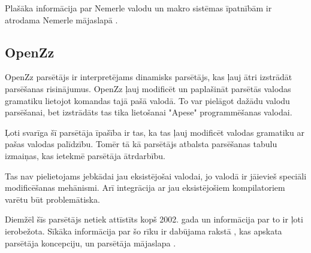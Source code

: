 Plašāka informācija par Nemerle valodu un makro sistēmas īpatnībām ir atrodama Nemerle mājaslapā \cite{NemerleWiki}.

\subsection{\label{sbs:rel_openzz}OpenZz}

OpenZz parsētājs ir interpretējams dinamisks parsētājs, kas ļauj ātri izstrādāt parsēšanas risinājumus. OpenZz ļauj modificēt un paplašināt parsētās valodas gramatiku lietojot komandas tajā pašā valodā. To var pielāgot dažādu valodu parsēšanai, bet izstrādāts tas tika lietošanai "Apese" programmēšanas valodai.

Ļoti svarīga šī parsētāja īpašība ir tas, ka tas ļauj modificēt valodas gramatiku ar pašas valodas palīdzību. Tomēr tā kā parsētājs atbalsta parsēšanas tabulu izmaiņas, kas ietekmē parsētāja ātrdarbību.

Tas nav pielietojams jebkādai jau eksistējošai valodai, jo valodā ir jāievieš speciāli modificēšanas mehānismi. Arī integrācija ar jau eksistējošiem kompilatoriem varētu būt problemātiska.

Diemžēl šīs parsētājs netiek attīstīts kopš 2002. gada un informācija par to ir ļoti ierobežota. Sīkāka informācija par šo rīku ir dabūjama rakstā \cite{Cabasino:DynamicParsers}, kas apskata parsētāja koncepciju, un parsētāja mājaslapa \cite{OpenZZParser}.